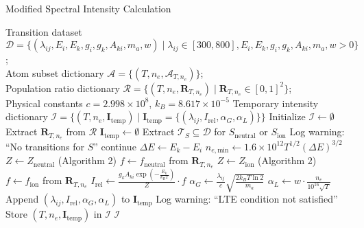 \begin{algorithm}
\small
\caption{Modified Spectral Intensity Calculation}
\begin{algorithmic}[1]
  \REQUIRE 
    Transition dataset $\mathcal{D} = \{ (\lambda_{ij}, E_i, E_k, g_i, g_k, A_{ki}, m_a, w) \mid \lambda_{ij} \in [300, 800], E_i, E_k, g_i, g_k, A_{ki}, m_a, w > 0 \}$; \\
    Atom subset dictionary $\mathcal{A} = \{ (T, n_e, \mathcal{A}_{T,n_e}) \}$; \\
    Population ratio dictionary $\mathcal{R} = \{ (T, n_e, \mathbf{R}_{T,n_e}) \mid \mathbf{R}_{T,n_e} \in [0, 1]^2 \}$; \\
    Physical constants $c = 2.998 \times 10^8$, $k_B = 8.617 \times 10^{-5}$
  \ENSURE 
    Temporary intensity dictionary $\mathcal{I} = \{ (T, n_e, \mathbf{I}_{\text{temp}}) \mid \mathbf{I}_{\text{temp}} = \{ (\lambda_{ij}, I_{\text{rel}}, \alpha_G, \alpha_L) \} \}$
  \STATE Initialize $\mathcal{I} \gets \emptyset$ 
    \STATE Extract $\mathbf{R}_{T,n_e}$ from $\mathcal{R}$ 
    \STATE $\mathbf{I}_{\text{temp}} \gets \emptyset$ 
      \STATE Extract $\mathcal{T}_S \subseteq \mathcal{D}$ for $S_{\text{neutral}}$ or $S_{\text{ion}}$ 
        \STATE Log warning: ``No transitions for $S$'' 
        \STATE continue
      \ENDIF
        \STATE $\Delta E \gets E_k - E_i$ 
        \STATE $n_{e,\text{min}} \gets 1.6 \times 10^{12} T^{1/2} (\Delta E)^{3/2}$ 
            \STATE $Z \gets Z_{\text{neutral}}$ (Algorithm 2) 
            \STATE $f \gets f_{\text{neutral}}$ from $\mathbf{R}_{T,n_e}$ 
          \ELSE
            \STATE $Z \gets Z_{\text{ion}}$ (Algorithm 2) 
            \STATE $f \gets f_{\text{ion}}$ from $\mathbf{R}_{T,n_e}$ 
          \ENDIF
          \STATE $I_{\text{rel}} \gets \frac{g_k A_{ki} \exp\left(-\frac{E_k}{k_B T}\right)}{Z} \cdot f$ 
          \STATE $\alpha_G \gets \frac{\lambda_{ij}}{c} \sqrt{\frac{2 k_B T \ln 2}{m_a}}$ 
          \STATE $\alpha_L \gets w \cdot \frac{n_e}{10^{16} \sqrt{T}}$ 
          \STATE Append $(\lambda_{ij}, I_{\text{rel}}, \alpha_G, \alpha_L)$ to $\mathbf{I}_{\text{temp}}$ 
        \ELSE
          \STATE Log warning: ``LTE condition not satisfied'' 
        \ENDIF
      \ENDFOR
    \ENDFOR
    \STATE Store $(T, n_e, \mathbf{I}_{\text{temp}})$ in $\mathcal{I}$ 
  \ENDFOR
  \STATE \RETURN $\mathcal{I}$ 
\end{algorithmic}
\end{algorithm}


